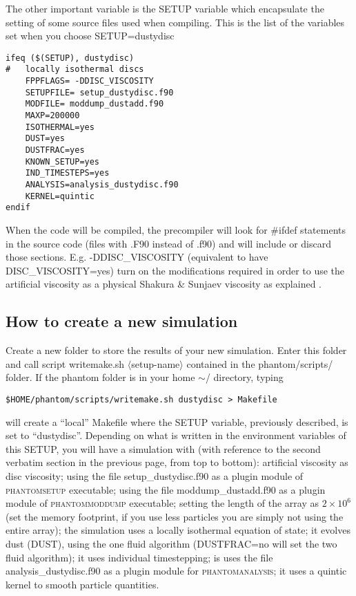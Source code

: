 \documentclass[10pt,a4paper,twoside]{article} %
\begin{document}
The other important variable is the SETUP variable which encapsulate the setting of some source files used when compiling. This is the list of the variables set when you choose SETUP=dustydisc
\begin{verbatim}
ifeq ($(SETUP), dustydisc)
#   locally isothermal discs
    FPPFLAGS= -DDISC_VISCOSITY
    SETUPFILE= setup_dustydisc.f90
    MODFILE= moddump_dustadd.f90
    MAXP=200000
    ISOTHERMAL=yes
    DUST=yes
    DUSTFRAC=yes
    KNOWN_SETUP=yes
    IND_TIMESTEPS=yes
    ANALYSIS=analysis_dustydisc.f90
    KERNEL=quintic
endif
\end{verbatim}
When the code will be compiled, the precompiler will look for \#ifdef statements in the source code (files with .F90 instead of .f90) and will include or discard those sections. E.g. -DDISC\_VISCOSITY (equivalent to have DISC\_VISCOSITY=yes) turn on the modifications required in order to use the artificial viscosity as a physical Shakura \& Sunjaev viscosity as explained \citep{phantompap}.

\subsection{How to create a new simulation}\label{howtorun}

Create a new folder to store the results of your new simulation. Enter this folder and call script writemake.sh $\langle$setup-name$\rangle$ contained in the phantom/scripts/ folder. If the phantom folder is in your home $\sim$/ directory, typing
\begin{verbatim}
$HOME/phantom/scripts/writemake.sh dustydisc > Makefile
\end{verbatim}
will create a ``local'' Makefile where the SETUP variable, previously described, is set to ``dustydisc''. Depending on what is written in the environment variables of this SETUP, you will have a simulation with (with reference to the second verbatim section in the previous page, from top to bottom): artificial viscosity as disc viscosity; using the file setup\_dustydisc.f90 as a plugin module of \textsc{phantomsetup} executable; using the file moddump\_dustadd.f90 as a plugin module of \textsc{phantommoddump} executable; setting the length of the array as $2\times 10^6$ (set the memory footprint, if you use less particles you are simply not using the entire array); the simulation uses a locally isothermal equation of state; it evolves dust (DUST), using the one fluid algorithm (DUSTFRAC=no will set the two fluid algorithm); it uses individual timestepping; is uses the file analysis\_dustydisc.f90 as a plugin module for \textsc{phantomanalysis}; it uses a quintic kernel to smooth particle quantities.
\end{document}
